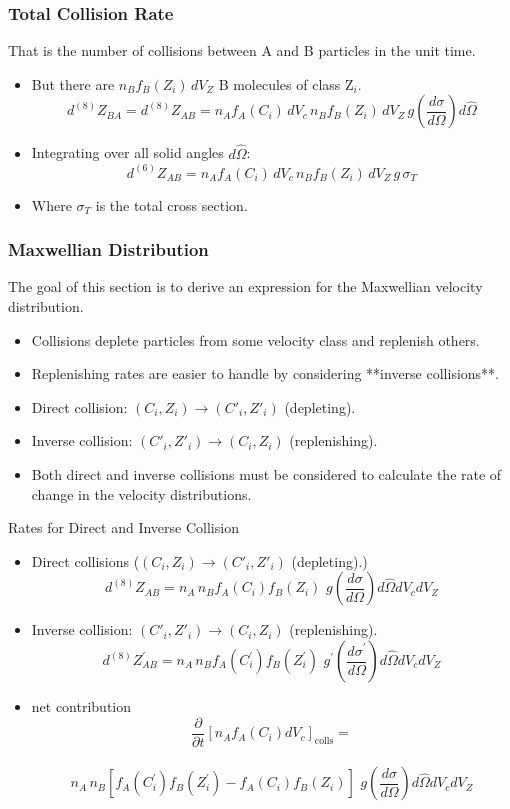 \documentclass{beamer}
\begin{document}
\begin{frame}
\frametitle{Total Collision Rate}
That is the number of collisions between A and B particles in the unit time.
\begin{itemize}
    \item But there are  \( n_B f_B(Z_i) \, dV_Z \) B molecules of class Z$_i$.
    \[
    d^{(8)}Z_{BA} = d^{(8)}Z_{AB}= n_A f_A(C_i) \, dV_c \, n_B f_B(Z_i) \, dV_Z \, g \left( \frac{d\sigma}{d\Omega} \right) d\hat{\Omega}
    \]
    \item Integrating over all solid angles \( d\hat{\Omega} \):
    \[
    d^{(6)}Z_{AB} = n_A f_A(C_i) \, dV_c \, n_B f_B(Z_i) \, dV_Z \, g \, \sigma_T
    \]
    \item Where \( \sigma_T \) is the total cross section.
\end{itemize}
\end{frame}
\begin{frame}
\frametitle{Maxwellian Distribution}
The goal of this section is to derive an expression for the Maxwellian velocity distribution.
\begin{itemize}
    \item Collisions deplete particles from some velocity class and replenish others.
    \item Replenishing rates are easier to handle by considering **inverse collisions**.
    \item Direct collision: \( (C_i, Z_i) \to (C'_i, Z'_i) \) (depleting).
    \item Inverse collision: \( (C'_i, Z'_i) \to (C_i, Z_i) \) (replenishing).
    \item Both direct and inverse collisions must be considered to calculate the rate of change in the velocity distributions.
\end{itemize}
\end{frame}

\begin{frame}{Rates for Direct and Inverse Collision}
    \begin{itemize}
    \item Direct collisions (\( (C_i, Z_i) \to (C'_i, Z'_i) \) (depleting).)
    \[
    d^{(8)}Z_{AB}= n_A \, n_B f_A(C_i)   f_B(Z_i) \, \, g \left( \frac{d\sigma}{d\Omega} \right)    d\hat{\Omega} dV_c dV_Z
   \]
    \item Inverse collision: \( (C'_i, Z'_i) \to (C_i, Z_i) \) (replenishing). 
      \[
    d^{(8)}Z^\prime_{AB}= n_A \, n_B f_A(C^\prime_i)   f_B(Z^\prime_i) \, \, g^\prime \left( \frac{d\sigma^\prime}{d\Omega} \right)    d\hat{\Omega} dV_c dV_Z
    \]
    \item net contribution
    \[  
    \frac{\partial}{\partial t} \left[ n_A f_A(C_i) dV_c \right]_{\text{colls}} = \] \\ 
    \[
    n_A \, n_B \left[f_A(C^\prime_i)   f_B(Z^\prime_i) - f_A(C_i)   f_B(Z_i)\right]\, \, g\left( \frac{d\sigma}{d\Omega} \right)    d\hat{\Omega} dV_c dV_Z
    \]
\end{itemize}
\end{frame}
\end{document}
